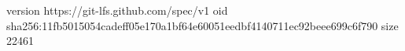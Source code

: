 version https://git-lfs.github.com/spec/v1
oid sha256:11fb5015054cadeff05e170a1bf64e60051eedbf4140711ec92beee699c6f790
size 22461
